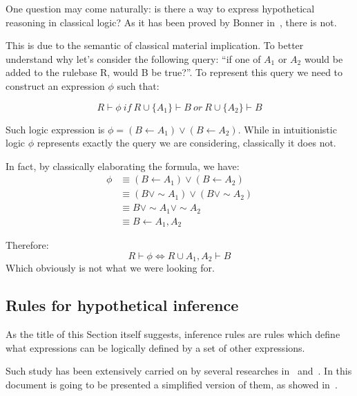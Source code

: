 One question may come naturally: is there
a way to express hypothetical reasoning in classical logic?
As it has been proved by Bonner in~\cite{Bonner88alogic}, there is not.

This is due to the semantic of classical material implication. To better understand why
let's consider the following query:
``if one of $A_1$ or $A_2$ would be added
to the rulebase R, would B be true?''. To represent this query we need to construct
an expression $\phi$ such that:

\begin{equation}
  R \vdash \phi\ if\ R \cup \{A_1\} \vdash B\ or\ R \cup \{A_2\} \vdash B
\end{equation}

Such logic expression is $\phi = (B \leftarrow A_1) \lor (B \leftarrow A_2)$.
While in intuitionistic logic $\phi$ represents exactly the query
we are considering, classically it does not.

In fact, by classically elaborating the formula, we have:
\begin{equation}
  \begin{split}
  \phi &\equiv (B \leftarrow A_1) \lor (B \leftarrow A_2)\\
  &\equiv (B \lor \sim A_1) \lor (B \lor \sim A_2)\\
  &\equiv B \lor \sim A_1 \lor \sim A_2 \\
  &\equiv B \leftarrow A_1, A_2
  \end{split}
\end{equation}

Therefore:
\begin{equation}
  R \vdash \phi \iff R \cup {A_1, A_2} \vdash B
\end{equation}
Which obviously is not what we were looking for.

\subsection{Rules for hypothetical inference}
\label{sec:rfhi}
As the title of this Section itself suggests, inference rules are rules
which define what expressions can be logically defined by a set of other expressions.

Such study has been extensively carried on by several researches
in~\cite{Gabbay1984319}\cite{Miller:1989:LAM:65822.65826} and~\cite{McCarty:1988:CIL:49484.49485}.
In this document is going to be presented a simplified
version of them, as showed in~\cite{Bonner88alogic}.


